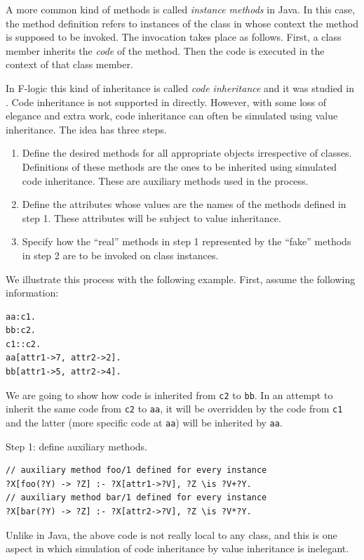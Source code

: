 \documentclass[11pt]{article}
\newcommand{\ERGO}{\mbox{\smaller{\ensuremath{\cal{E}}\smaller{{\sc{RGO}}}}}\xspace}
\newcommand{\FLSYSTEM}{\ERGO}
\newcommand{\fl}{\mbox{F-logic}\xspace}
\begin{document}
A more common kind of methods is called \emph{instance methods} in Java.
In this case, the method definition refers to instances of the class in
whose context the method is supposed to be invoked. The invocation takes
place as follows. First, a class member inherits the \emph{code} of the
method. Then the code is executed in the context of that class member.

In \fl this kind of inheritance is called \emph{code inheritance} and it was
studied in \cite{code-inheritance-2003,kifer-yang-inheritance-2006}. Code inheritance is not 
supported in \FLSYSTEM directly. However, with some loss of
elegance and extra work, code inheritance can often be simulated using value
inheritance. The idea has three steps.
\begin{enumerate}
\item  Define the desired methods for all appropriate objects irrespective of
  classes. Definitions of these methods are the ones to be inherited using
  simulated code inheritance. These are auxiliary methods used in the
  process.
\item Define the attributes whose values are the names of the methods defined
  in step 1.  These attributes will be subject to value inheritance.
\item  Specify how the ``real'' methods in step 1 represented by
  the ``fake'' methods in step 2 are to be invoked on class instances.
\end{enumerate}
We illustrate this process with the following example. First, assume the
following information:
\begin{verbatim}
aa:c1.
bb:c2.
c1::c2.
aa[attr1->7, attr2->2].
bb[attr1->5, attr2->4].  
\end{verbatim}
We are going to show how code is inherited from {\tt c2} to {\tt bb}. In
an attempt to inherit the same code from {\tt c2} to {\tt aa}, it
will be overridden by the code from {\tt c1} and the latter (more specific
code at \texttt{aa})  will be inherited
by {\tt aa}. 

\noindent
Step 1: define auxiliary methods.
\begin{verbatim}
// auxiliary method foo/1 defined for every instance
?X[foo(?Y) -> ?Z] :- ?X[attr1->?V], ?Z \is ?V+?Y.
// auxiliary method bar/1 defined for every instance
?X[bar(?Y) -> ?Z] :- ?X[attr2->?V], ?Z \is ?V*?Y.  
\end{verbatim}
Unlike in Java, the above code is not really local to any class, and this is
one aspect in which simulation of code inheritance by value inheritance is
inelegant.
\end{document}
